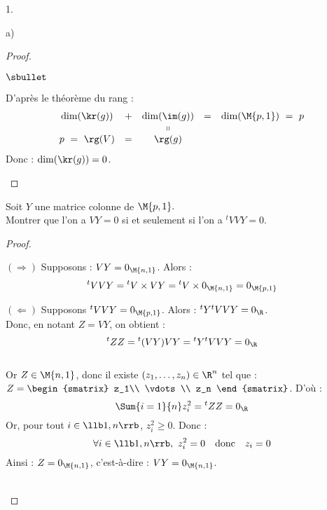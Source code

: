 \documentclass[11pt]{article}%
\begin{document}
\begin{noliste}{1.}
\begin{noliste}{a)}
\begin{proof}
\begin{noliste}{$\sbullet$}
    
    \item D'après le théorème du rang :
    \[
     \begin{array}{ccccc}
      \dim(\kr(g)) & + & \dim(\im(g)) & = & \dim(\M{p,1}) \ = \ p
      \\
       & & \shortparallel 
      \\
      p \ = \ \rg(V) & = & \rg(g)
     \end{array}
    \]
    Donc : $\dim(\kr(g)) = 0$.
    ~\\[-1.6cm]
   \end{noliste}
  \end{proof}
  
  \item Soit $Y$ une matrice colonne de $\M{p,1}.$\\
  Montrer que l'on a $VY=0$ si et seulement si l'on a ${}^t{}VVY=0$.
  
  \begin{proof}~
   \begin{liste}{\quad}
    \item[$(\Rightarrow)$]
    Supposons : $VY=0_{\M{n,1}}$. Alors :
    \[
     {}^t{}VVY = {}^t{}V \times VY = {}^t{} V \times 0_{\M{n,1}}
     = 0_{\M{p,1}}
    \]
    
    \item[$(\Leftarrow)$]
    Supposons ${}^t{}VVY=0_{\M{p,1}}$. Alors : ${}^t{} Y {}^t{} V
    VY=0_{\R}$. \\[.1cm]
    Donc, en notant $Z=VY$, on obtient :
    \[
     {}^t{}ZZ= {}^t{}(VY)VY = {}^t{}Y {}^t{} VVY=0_{\R}
    \]~\\[-.4cm]
    Or $Z\in \M{n,1}$, donc il existe $(z_1, \ldots, z_n) \in \R^n$
    tel que : $Z=
    \begin{smatrix}
     z_1\\
     \vdots \\
     z_n
    \end{smatrix}$. D'où :~\\[-.4cm]
    \[
     \Sum{i=1}{n} z_i^2 = {}^t{}ZZ=0_{\R}
    \]
    Or, pour tout $i \in \llb 1, n\rrb$, $z_i^2 \geq 0$. Donc :
    \[
     \forall i \in \llb 1,n \rrb, \ z_i^2 =0 \quad \mbox{donc} 
     \quad z_i=0
    \]
    Ainsi : $Z=0_{\M{n,1}}$, c'est-à-dire : $VY=0_{\M{n,1}}$.
   \end{liste}
   ~\\[-1cm]
  \end{proof}
  

\end{noliste}
\end{noliste}
\end{document}
